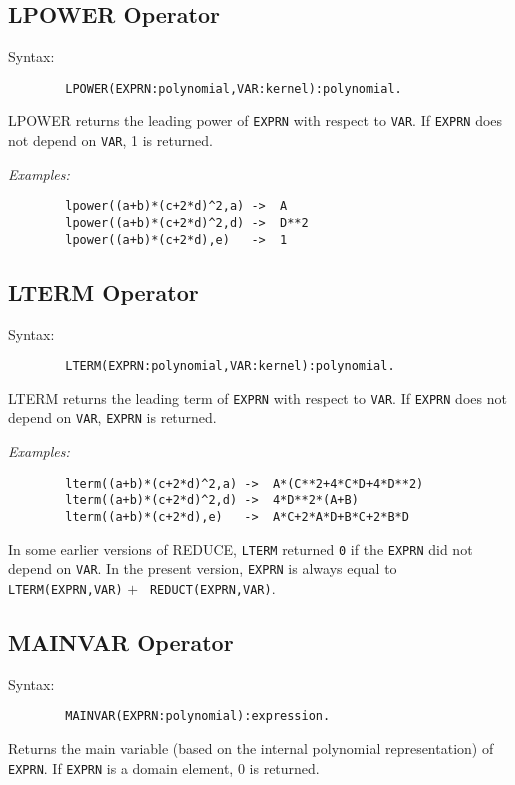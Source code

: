 \subsection{LPOWER Operator}

\begin{samepage}
Syntax:
\begin{verbatim}
        LPOWER(EXPRN:polynomial,VAR:kernel):polynomial.
\end{verbatim}
LPOWER returns the leading power of {\tt EXPRN} with respect to {\tt VAR}.
If {\tt EXPRN} does not depend on {\tt VAR}, 1 is returned.
\end{samepage}

{\it Examples:}
\begin{verbatim}
        lpower((a+b)*(c+2*d)^2,a) ->  A
        lpower((a+b)*(c+2*d)^2,d) ->  D**2
        lpower((a+b)*(c+2*d),e)   ->  1
\end{verbatim}

\subsection{LTERM Operator}

\begin{samepage}
Syntax:
\begin{verbatim}
        LTERM(EXPRN:polynomial,VAR:kernel):polynomial.
\end{verbatim}
LTERM returns the leading term of {\tt EXPRN} with respect to {\tt VAR}.
If {\tt EXPRN} does not depend on {\tt VAR}, {\tt EXPRN} is returned.
\end{samepage}

{\it Examples:}
\begin{verbatim}
        lterm((a+b)*(c+2*d)^2,a) ->  A*(C**2+4*C*D+4*D**2)
        lterm((a+b)*(c+2*d)^2,d) ->  4*D**2*(A+B)
        lterm((a+b)*(c+2*d),e)   ->  A*C+2*A*D+B*C+2*B*D
\end{verbatim}

{\COMPATNOTE} In some earlier versions of REDUCE, {\tt LTERM} returned
{\tt 0} if the {\tt EXPRN} did not depend on {\tt VAR}.  In the present
version, {\tt EXPRN} is always equal to {\tt LTERM(EXPRN,VAR)} $+$ {\tt
REDUCT(EXPRN,VAR)}.

\subsection{MAINVAR Operator}

Syntax:
\begin{verbatim}
        MAINVAR(EXPRN:polynomial):expression.
\end{verbatim}
Returns the main variable (based on the internal polynomial representation)
of {\tt EXPRN}. If {\tt EXPRN} is a domain element, 0 is returned.

